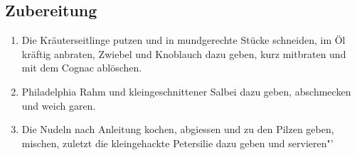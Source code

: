 \documentclass[a4paper,abstracton]{scrreprt}
\begin{document}
\subsection{Zubereitung}
\begin{enumerate}
\item Die Kräuterseitlinge putzen und in mundgerechte Stücke schneiden, im Öl kräftig anbraten, Zwiebel und Knoblauch dazu geben, kurz mitbraten und mit dem Cognac ablöschen.
\item Philadelphia Rahm und kleingeschnittener Salbei dazu geben, abschmecken und weich garen.
\item Die Nudeln nach Anleitung kochen, abgiessen und zu den Pilzen geben, mischen, zuletzt die kleingehackte Petersilie dazu geben und servieren"'
\end{enumerate}

\printbibliography[heading=lit]
\end{document}
